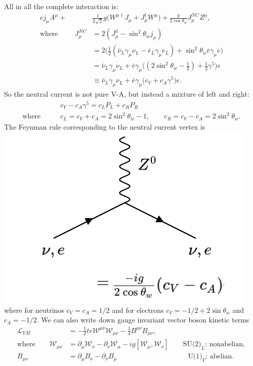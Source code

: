 All in all the complete interaction is:
\begin{equation}
\begin{split}
ej_\mu A^\mu + &\frac{1}{2\sqrt{2}}g\big(W^{\mu \dagger}J_\mu + J_\mu^\dagger W^\mu \big) + \frac{g}{2 \cos\theta_w} J_\mu^{NC}Z^\mu, \\
\text{where } \qquad J_\mu^{NC} &= 2(J_\mu^3 - \sin^2\theta_w j_\mu) \\
&= 2\bigg( \frac{1}{2} (\bar{\nu}_L \gamma_\mu \nu_L - \bar{e}_L \gamma_\mu e_L) + \sin^2\theta_w \bar{e} \gamma_\mu e \bigg) \\
&= \bar{\nu}_L \gamma_\mu \nu_L + \bar{e} \gamma_\mu \big( (2\sin^2\theta_w - \frac{1}{2}) + \frac{1}{2} \gamma^5 \big) e \\
&\equiv \bar{\nu}_L \gamma_\mu \nu_L + \bar{e} \gamma_\mu \big(c_V + c_A \gamma^5 \big)e.
\end{split}
\end{equation}
So the neutral current is not pure V-A, but instead a mixture of left and right:
\begin{equation}
\begin{split}
&c_V- c_A\gamma^5 = c_L P_L + c_R P_R \\
\text{where} \qquad &c_L = c_V + c_A = 2 \sin^2\theta_w -1, \qquad c_R = c_V-c_A = 2 \sin^2\theta_w.
\end{split}
\end{equation}
The Feynman rule corresponding to the neutral current vertex is
%
\newline
  \includegraphics[width=0.4\linewidth]{figs/21a.png}
\newline
where for neutrinos $c_V = c_A = 1/2$ and for electrons $c_V = -1/2 + 2\sin\theta_w$ and $c_A = -1/2$. We can also write down gauge invariant vector boson kinetic terms
\begin{equation} \label{eqn:22a}
\begin{split}
\mathcal{L}_{YM} &= - \frac{1}{2} tr \mathcal{W}^{\mu \nu} \mathcal{W}_{\mu \nu} - \frac{1}{4} B^{\mu \nu} B_{\mu \nu}, \\
\text{where} \qquad \mathcal{W}_{\mu \nu} &= \partial_\mu \mathcal{W}_\nu - \partial_\nu \mathcal{W}_\mu -ig[\mathcal{W}_\mu, \mathcal{W}_\nu] \qquad \text{SU(2)}_L \text{: nonabelian}, \\
B_{\mu \nu} &= \partial_\mu B_\nu - \partial_\nu B_\mu \qquad \qquad \qquad \qquad \qquad \text{U(1)}_Y \text{: abelian}.
\end{split}
\end{equation}
